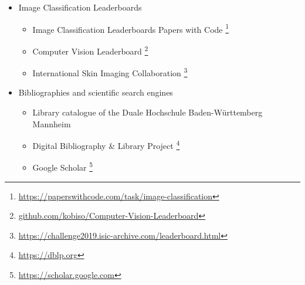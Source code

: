 \begin{itemize}
	\item Image Classification Leaderboards
	\begin{itemize}
		\item Image Classification Leaderboards Papers with Code \footnote{\url{https://paperswithcode.com/task/image-classification}}
		\item Computer Vision Leaderboard \footnote{\url{github.com/kobiso/Computer-Vision-Leaderboard}}
		\item International Skin Imaging Collaboration \footnote{\url{https://challenge2019.isic-archive.com/leaderboard.html}}\
	\end{itemize}
	\item Bibliographies and scientific search engines
	\begin{itemize}
		\item Library catalogue of the Duale Hochschule Baden-Württemberg Mannheim
		\item Digital Bibliography \& Library Project \footnote{\url{https://dblp.org}}
		\item Google Scholar \footnote{\url{https://scholar.google.com}}
	\end{itemize}
\end{itemize}